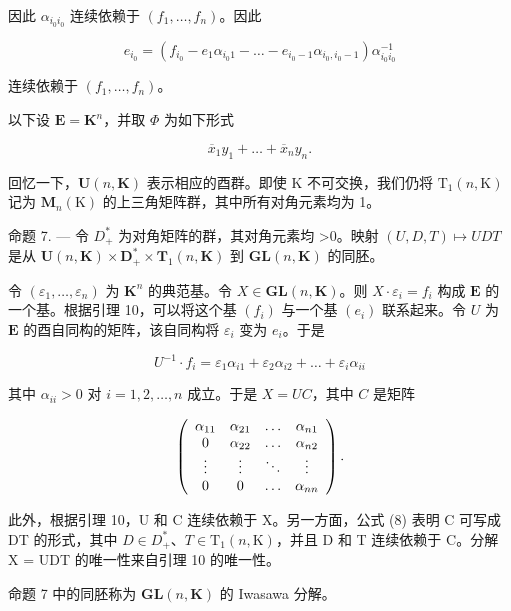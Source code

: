 因此 \(\alpha_{i_0i_0}\) 连续依赖于 \((f_1,\ldots ,f_n)\)。因此

\[
e _ {i _ {0}} = (f _ {i _ {0}} - e _ {1} \alpha_ {i _ {0} 1} - \dots - e _ {i _ {0} - 1} \alpha_ {i _ {0}, i _ {0} - 1}) \alpha_ {i _ {0} i _ {0}} ^ {- 1}
\]

连续依赖于 \((f_1, \ldots, f_n)\)。

以下设 \(\mathbf{E} = \mathbf{K}^n\)，并取 \(\Phi\) 为如下形式

\[
\overline {{{x}}} _ {1} y _ {1} + \dots + \overline {{{x}}} _ {n} y _ {n}.
\]

回忆一下，\(\mathbf{U}(n,\mathbf{K})\) 表示相应的酉群。即使 K 不可交换，我们仍将 \(\mathrm{T}_{1}(n,\mathrm{K})\) 记为 \(\mathbf{M}_{n}(\mathrm{K})\) 的上三角矩阵群，其中所有对角元素均为 1。

命题 7. --- 令 \(D_{+}^{*}\) 为对角矩阵的群，其对角元素均 \textgreater0。映射 \((U,D,T)\mapsto UDT\) 是从 \(\mathbf{U}(n,\mathbf{K})\times\mathbf{D}_{+}^{*}\times\mathbf{T}_{1}(n,\mathbf{K})\) 到 \(\mathbf{GL}(n,\mathbf{K})\) 的同胚。

令 \((\varepsilon_1, \ldots, \varepsilon_n)\) 为 \(\mathbf{K}^n\) 的典范基。令 \(X \in \mathbf{GL}(n, \mathbf{K})\)。则 \(X \cdot \varepsilon_i = f_i\) 构成 \(\mathbf{E}\) 的一个基。根据引理 10，可以将这个基 \((f_i)\) 与一个基 \((e_i)\) 联系起来。令 \(U\) 为 \(\mathbf{E}\) 的酉自同构的矩阵，该自同构将 \(\varepsilon_i\) 变为 \(e_i\)。于是

\[
U ^ {- 1} \cdot f _ {i} = \varepsilon_ {1} \alpha_ {i 1} + \varepsilon_ {2} \alpha_ {i 2} + \dots + \varepsilon_ {i} \alpha_ {i i}
\]

其中 \(\alpha_{ii} > 0\) 对 \(i = 1,2,\ldots ,n\) 成立。于是 \(X = UC\)，其中 \(C\) 是矩阵

\[
\left( \begin{array}{c c c c} \alpha_ {1 1} & \alpha_ {2 1} & \ldots & \alpha_ {n 1} \\ 0 & \alpha_ {2 2} & \ldots & \alpha_ {n 2} \\ \vdots & \vdots & \ddots & \vdots \\ 0 & 0 & \ldots & \alpha_ {n n} \end{array} \right).
\]

此外，根据引理 10，U 和 C 连续依赖于 X。另一方面，公式 (8) 表明 C 可写成 DT 的形式，其中 \(D \in D_{+}^{*}\)、\(T \in \mathrm{T}_{1}(n, \mathrm{K})\)，并且 D 和 T 连续依赖于 C。分解 X = UDT 的唯一性来自引理 10 的唯一性。

命题 7 中的同胚称为 \(\mathbf{GL}(n,\mathbf{K})\) 的 Iwasawa 分解。

